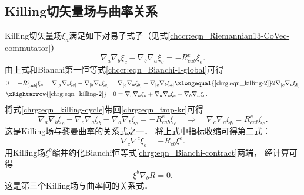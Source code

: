 \subsection{Killing切矢量场与曲率关系}
Killing切矢量场$\xi_a$满足如下对易子式子（见式\eqref{chccr:eqn_Riemannian13-CoVec-commutator}）
\begin{equation}\label{chrg:eqn_tmp-kr}
    {\nabla_a}{\nabla_b}{\xi_c} - {\nabla_b}{\nabla_a}{\xi_c} = -R_{cab}^e{\xi_e}.
\end{equation}
由上式和Bianchi第一恒等式\eqref{chccr:eqn_Bianchi-I-global}可得
\begin{align}
    &0=-R_{[cab]}^{e}{\xi_e}= {\nabla_{[a}}{\nabla_b}{\xi_{c]}} - {\nabla_{[b}}{\nabla_a}{\xi_{c]}}
    = {\nabla_{[c}}{\nabla_a}{\xi_{b]}} - {\nabla_{[c}}{\nabla_b}{\xi_{a]}}
    \xlongequal{\ref{chrg:eqn_killing-2}} 2 {\nabla_{[c}}{\nabla_a}{\xi_{b]}} \notag \\
    &\xRightarrow{\ref{chrg:eqn_killing-2}} \quad
    0= {\nabla_{c}}{\nabla_a}{\xi_{b}} + {\nabla_{a}}{\nabla_b}{\xi_{c}} -
    {\nabla_{b}}{\nabla_a}{\xi_{c}} . \label{chrg:eqn_killing-cycle}
\end{align}
将式\eqref{chrg:eqn_killing-cycle}带回\eqref{chrg:eqn_tmp-kr}可得
\begin{equation}\label{chrg:eqn_killing-Riemann-1}
    {\nabla_a}{\nabla_b}{\xi_c} -   {\nabla_{c}}{\nabla_a}{\xi_{b}}
    - {\nabla_{a}}{\nabla_b}{\xi_{c}} = -R_{cab}^e{\xi_e} \quad \Rightarrow \quad
    {\nabla_c}{\nabla_a}{\xi_b} = R_{cab}^e{\xi_e}.
\end{equation}
这是Killing场与黎曼曲率的关系式之一．
将上式中指标收缩可得第二式：
\begin{equation}\label{chrg:eqn_killing-Riemann-2}
    {\nabla_c}{\nabla^c}{\xi_b} = -R_{eb}{\xi^e}.
\end{equation}
用Killing场$\xi^b$缩并约化Bianchi恒等式\eqref{chrg:eqn_Bianchi-contract}两端，
经计算可得
\begin{equation}\label{chrg:eqn_killing-Riemann-3}
    \xi^b\nabla_b R= 0 .
\end{equation}
这是第三个Killing场与曲率间的关系式．

